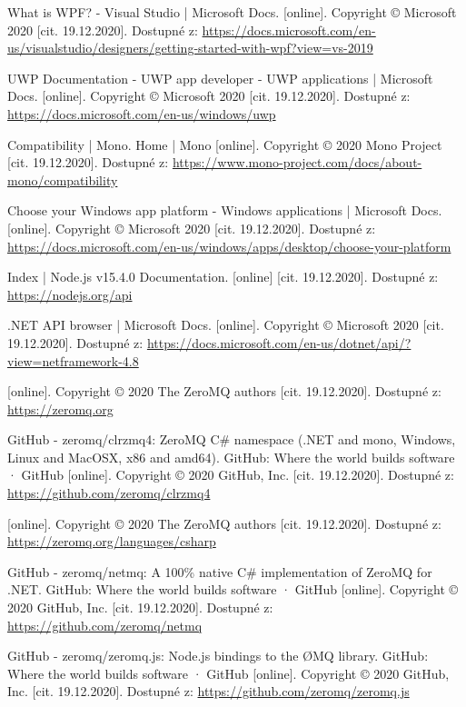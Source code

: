 \begin{thebibliography}{99}
What is WPF? - Visual Studio | Microsoft Docs. [online]. Copyright © Microsoft 2020 [cit. 19.12.2020]. Dostupné z: \url{https://docs.microsoft.com/en-us/visualstudio/designers/getting-started-with-wpf?view=vs-2019}

UWP Documentation - UWP app developer - UWP applications | Microsoft Docs. [online]. Copyright © Microsoft 2020 [cit. 19.12.2020]. Dostupné z: \url{https://docs.microsoft.com/en-us/windows/uwp}

Compatibility | Mono. Home | Mono [online]. Copyright © 2020 Mono Project [cit. 19.12.2020]. Dostupné z: \url{https://www.mono-project.com/docs/about-mono/compatibility}

Choose your Windows app platform - Windows applications | Microsoft Docs. [online]. Copyright © Microsoft 2020 [cit. 19.12.2020]. Dostupné z: \url{https://docs.microsoft.com/en-us/windows/apps/desktop/choose-your-platform}

Index | Node.js v15.4.0 Documentation. [online] [cit. 19.12.2020]. Dostupné z: \url{https://nodejs.org/api}

.NET API browser | Microsoft Docs. [online]. Copyright © Microsoft 2020 [cit. 19.12.2020]. Dostupné z: \url{https://docs.microsoft.com/en-us/dotnet/api/?view=netframework-4.8}

[online]. Copyright © 2020 The ZeroMQ authors [cit. 19.12.2020]. Dostupné z: \url{https://zeromq.org}

GitHub - zeromq/clrzmq4: ZeroMQ C\# namespace (.NET and mono, Windows, Linux and MacOSX, x86 and amd64). GitHub: Where the world builds software · GitHub [online]. Copyright © 2020 GitHub, Inc. [cit. 19.12.2020]. Dostupné z: \url{https://github.com/zeromq/clrzmq4}

[online]. Copyright © 2020 The ZeroMQ authors [cit. 19.12.2020]. Dostupné z: \url{https://zeromq.org/languages/csharp}

GitHub - zeromq/netmq: A 100\% native C\# implementation of ZeroMQ for .NET. GitHub: Where the world builds software · GitHub [online]. Copyright © 2020 GitHub, Inc. [cit. 19.12.2020]. Dostupné z: \url{https://github.com/zeromq/netmq}

GitHub - zeromq/zeromq.js: Node.js bindings to the ØMQ library. GitHub: Where the world builds software · GitHub [online]. Copyright © 2020 GitHub, Inc. [cit. 19.12.2020]. Dostupné z: \url{https://github.com/zeromq/zeromq.js}


\end{thebibliography}
